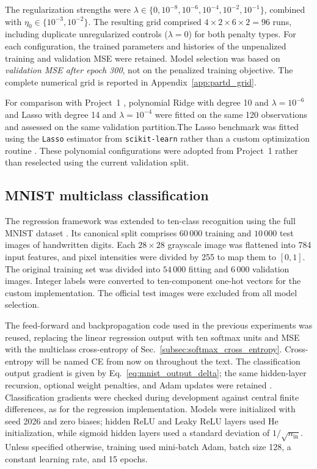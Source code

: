 \documentclass[aps,rmp,reprint,amsmath,amssymb,graphicx,longbibliography]{revtex4-1}
\begin{document}
The regularization strengths were
$\lambda\in\{0,10^{-8},10^{-6},10^{-4},10^{-2},10^{-1}\}$, combined with
$\eta_0\in\{10^{-3},10^{-2}\}$. The resulting grid comprised
$4\times2\times6\times2=96$ runs, including duplicate
unregularized controls ($\lambda=0$) for both penalty types.
For each configuration, the trained parameters and histories of the
unpenalized training and validation MSE were retained. Model selection
was based on \emph{validation MSE after epoch 300}, not on the
penalized training objective. The complete numerical grid is
reported in Appendix~\ref{app:partd_grid}.

For comparison with Project~1 \cite{Project_1}, polynomial Ridge with degree 10 and
$\lambda=10^{-6}$ and Lasso with degree 14 and
$\lambda=10^{-4}$ were fitted on the same 120 observations and
assessed on the same validation partition.The Lasso benchmark was fitted using the \texttt{Lasso} estimator from
\texttt{scikit-learn} rather than a custom optimization routine
\cite{Pedregosa2011}.  These polynomial configurations
were adopted from Project~1 rather than reselected using the current
validation split.


\subsection{MNIST multiclass classification}
\label{subsec:mnist_methods}

The regression framework was extended to ten-class recognition using
the full MNIST dataset \cite{lecun2010mnist}. Its canonical split comprises
$60\,000$ training and $10\,000$ test images of handwritten digits.
Each $28\times28$ grayscale image was flattened into 784 input features,
and pixel intensities were divided by 255 to map them to $[0,1]$.
The original training set was divided into $54\,000$ fitting and $6\,000$ validation images.
Integer labels were converted to ten-component one-hot vectors for the
custom implementation. The official test images were excluded from all
model selection.

The feed-forward and backpropagation code used in the previous experiments was reused,
replacing the linear regression output with ten softmax units and MSE
with the multiclass cross-entropy of
Sec.~\ref{subsec:softmax_cross_entropy}. Cross-entropy will be named CE from now on throughout the text. The classification output
gradient is given by Eq.~\eqref{eq:mnist_output_delta}; the same
hidden-layer recursion, optional weight penalties, and Adam updates
were retained \cite{Book_Ch8}. Classification gradients were checked
during development against central finite differences, as for the
regression implementation. Models were initialized with seed 2026 and
zero biases; hidden ReLU and Leaky ReLU layers used He initialization,
while sigmoid hidden layers used a standard deviation of
$1/\sqrt{n_{\mathrm{in}}}$. Unless specified otherwise, training used
mini-batch Adam, batch size 128, a constant learning rate, and 15 epochs.
\end{document}
